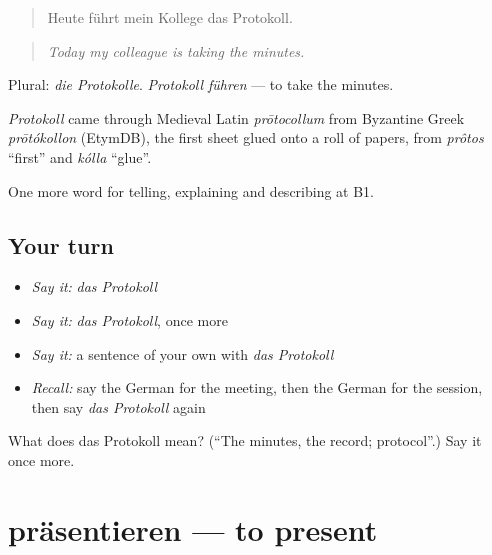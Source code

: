 \begin{quote}
Heute führt mein Kollege das Protokoll.
\end{quote}

\begin{quote}
\emph{Today my colleague is taking the minutes.}
\end{quote}

Plural: \emph{die Protokolle}. \emph{Protokoll führen} — to take the minutes.

\begin{cousinweb}
\emph{Protokoll} came through Medieval Latin \emph{prōtocollum} from Byzantine Greek \emph{prōtókollon} (EtymDB), the first sheet glued onto a roll of papers, from \emph{prôtos} \textquotedblleft{}first\textquotedblright{} and \emph{kólla} \textquotedblleft{}glue\textquotedblright{}.
\end{cousinweb}

\begin{grammarlens}[title={What you've built}]
One more word for telling, explaining and describing at B1.
\end{grammarlens}

\subsection*{Your turn}
\begin{itemize}
\raggedright
  \item \emph{Say it:} \emph{das Protokoll}
  \item \emph{Say it:} \emph{das Protokoll}, once more
  \item \emph{Say it:} a sentence of your own with \emph{das Protokoll}
  \item \emph{Recall:} say the German for the meeting, then the German for the session, then say \emph{das Protokoll} again
\end{itemize}

\begin{tcolorbox}[breakable,colback=teal!4,colframe=teal!35!black,title={Before you move on}]
What does das Protokoll mean? (\textquotedblleft{}The minutes, the record; protocol\textquotedblright{}.) Say it once more.
\end{tcolorbox}
\section[präsentieren]{präsentieren — to present}

\label{lesson:GE-C354-praesentieren}



